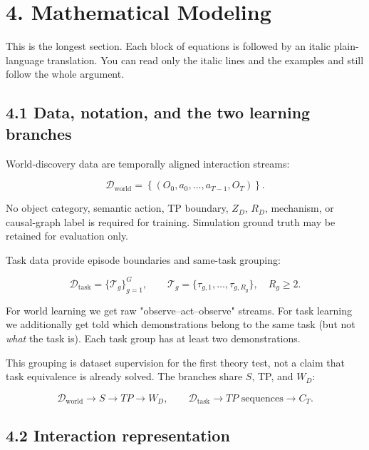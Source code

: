 \documentclass[11pt]{article}
\newenvironment{plainword}{%
  \par\medskip\noindent\begin{minipage}{\textwidth}%
  \color{gray!75!black}\small\itshape
}{%
  \end{minipage}\par\medskip}
\begin{document}
\section*{4. Mathematical Modeling}

\begin{plainword}
This is the longest section. Each block of equations is followed by an italic plain-language translation. You can read only the
italic lines and the examples and still follow the whole argument.
\end{plainword}

\subsection*{4.1 Data, notation, and the two learning branches}

World-discovery data are temporally aligned interaction streams:

\[
\mathcal D_{\mathrm{world}}=
\left\{(O_0,a_0,\ldots,a_{T-1},O_T)\right\}.
\]

No object category, semantic action, TP boundary, $Z_D$, $R_D$, mechanism, or causal-graph label is required for training.
Simulation ground truth may be retained for evaluation only.

Task data provide episode boundaries and same-task grouping:

\[
\boxed{
\mathcal D_{\mathrm{task}}=\{\mathcal T_g\}_{g=1}^{G},\qquad
\mathcal T_g=\{\tau_{g,1},\ldots,\tau_{g,R_g}\},\quad R_g\geq2.}
\]

\begin{plainword}
For world learning we get raw "observe--act--observe" streams. For task learning we additionally get told which demonstrations
belong to the same task (but not \emph{what} the task is). Each task group has at least two demonstrations.
\end{plainword}

This grouping is dataset supervision for the first theory test, not a claim that task equivalence is already solved. The branches
share $S$, TP, and $W_D$:

\[
\boxed{
\mathcal D_{\mathrm{world}}\rightarrow S\rightarrow TP\rightarrow W_D,
\qquad
\mathcal D_{\mathrm{task}}\rightarrow TP\text{ sequences}\rightarrow C_T.}
\]

\subsection*{4.2 Interaction representation}
\end{document}
